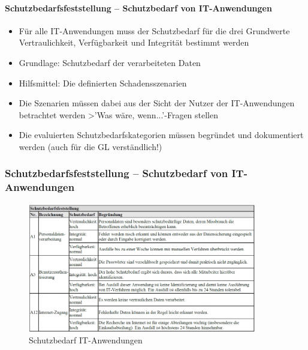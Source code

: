 \documentclass[10pt,a4paper]{article}
\begin{document}
\paragraph*{Schutzbedarfsfeststellung – Schutzbedarf von IT-Anwendungen}
\begin{itemize}[noitemsep,topsep=0pt,leftmargin=*]
    \item Für alle IT-Anwendungen muss der Schutzbedarf für die
    drei Grundwerte Vertraulichkeit, Verfügbarkeit und
    Integrität bestimmt werden
    \item Grundlage: Schutzbedarf der verarbeiteten Daten
    \item Hilfsmittel: Die definierten Schadensszenarien
    \item Die Szenarien müssen dabei aus der Sicht der Nutzer der
    IT-Anwendungen betrachtet werden \textgreater 'Was wäre,
    wenn...'-Fragen stellen
    \item Die evaluierten Schutzbedarfskategorien müssen begründet
    und dokumentiert werden (auch für die GL verständlich!)
\end{itemize}

\subsubsection*{Schutzbedarfsfeststellung – Schutzbedarf von IT-Anwendungen}
\begin{figure}[H]
    \begin{center}
    \includegraphics[width=10cm]{images/Schutzbedarf IT-Anwendungen.png}
    \caption{Schutzbedarf IT-Anwendungen}
    \label{Schutzbedarf IT-Anwendungen}
    \end{center}
\end{figure}
\end{document}
